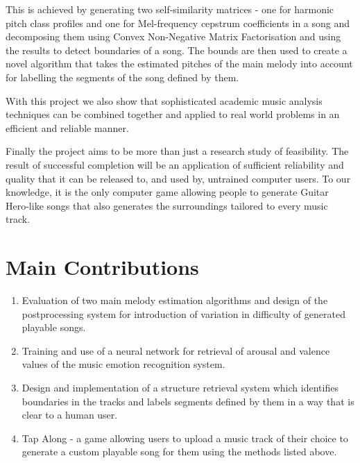 This is achieved by generating two self-similarity matrices - one for harmonic pitch class profiles and one for Mel-frequency cepstrum coefficients in a song and decomposing them using Convex Non-Negative Matrix Factorisation and using the results to detect boundaries of a song. The bounds are then used to create a novel algorithm that takes the estimated pitches of the main melody into account for labelling the segments of the song defined by them.

With this project we also show that sophisticated academic music analysis techniques can be combined together and applied to real world problems in an efficient and reliable manner. 

Finally the project aims to be more than just a research study of feasibility. The result of successful completion will be an application of sufficient reliability and quality that it can be released to, and used by, untrained computer users. To our knowledge, it is the only computer game allowing people to generate Guitar Hero-like songs that also generates the surroundings tailored to every music track.

\section*{Main Contributions}

\begin{enumerate}
\item Evaluation of two main melody estimation algorithms and design of the postprocessing system for introduction of variation in difficulty of generated playable songs.
\item Training and use of a neural network for retrieval of arousal and valence values of the music emotion recognition system.
\item Design and implementation of a structure retrieval system which identifies boundaries in the tracks and labels segments defined by them in a way that is clear to a human user.
\item Tap Along - a game allowing users to upload a music track of their choice to generate a custom playable song for them using the methods listed above.
\end{enumerate}


